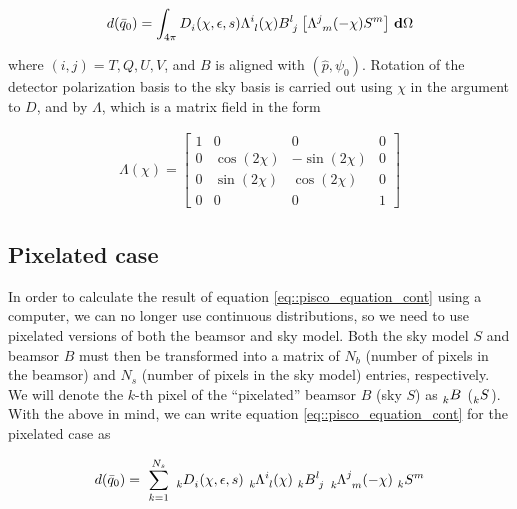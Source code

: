 \documentclass[a4paper,11pt]{article}
\begin{document}
\begin{equation}
\begin{aligned}
d(\bar{q}_0) =  \int_{4\pi} \tensor{D}{_{i}}(\chi,\epsilon,s) \tensor{\Lambda}{^{i}_{l}}(\chi)  \tensor{B}{^{l}_{j} } \left[ \tensor{\Lambda}{^{j}_{m}}(-\chi) \tensor{S}{^{m}} \right ] \, \mathbf{d} \Omega
\end{aligned}
\label{eq::pisco_equation_cont}
\end{equation}

\noindent
where $(i,j) = T,Q,U,V$, and $B$ is aligned with $(\hat{p},\psi_0)$. Rotation of the detector polarization basis to the sky basis is carried out using $\chi$ in the argument to $D$, and by $\Lambda$, which is a matrix field in the form

\begin{equation}
\begin{aligned}
\Lambda(\chi) =
\begin{bmatrix}
1  & 0 & 0 & 0\\
0  & \cos(2\chi) & -\sin(2\chi) & 0\\
0  &\sin(2\chi) & \cos(2\chi) & 0\\
0  & 0 & 0 & 1
\end{bmatrix}
\end{aligned}
\label{eq::lambda_operator}
\end{equation}

\subsection{Pixelated case}
\label{sec::pixel_conv}

In order to calculate the result of equation \ref{eq::pisco_equation_cont} using a computer, we can no longer use continuous distributions, so we need to use pixelated versions of both the beamsor and sky model. Both the sky model $S$ and beamsor $B$ must then be transformed into a matrix of $N_b$ (number of pixels in the beamsor) and $N_s$ (number of pixels in the sky model) entries, respectively. We will denote the $k$-th pixel of the ``pixelated'' beamsor $B$ (sky $S$) as $\tensor[_k]{B}{}$ ($\tensor[_k]{S}{}$). With the above in mind, we can write equation \ref{eq::pisco_equation_cont} for the pixelated case as

\begin{equation}
\begin{aligned}
d(\bar{q}_0) = \
\sum_{k=1}^{N_s} \
\tensor[_k]{D}{_{i}}(\chi,\epsilon,s) \
\tensor[_k]{\Lambda}{^{i}_{l}}(\chi) \
\tensor[_k]{B}{^l_j} \
\tensor[_k]{\Lambda}{^{j}_{m}}(-\chi) \
\tensor[_k]{S}{^m}
\end{aligned}
\label{eq::discrete_beam_conv_tensor}
\end{equation}
\end{document}
